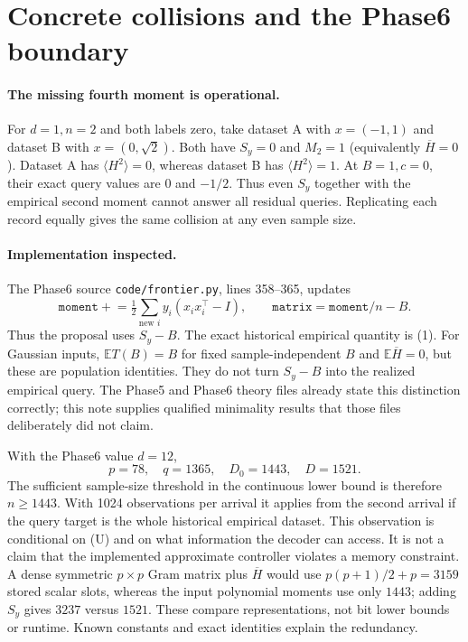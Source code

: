\documentclass[11pt]{article}
\newcommand{\E}{\mathbb E}
\begin{document}
\section{Concrete collisions and the Phase6 boundary}

\paragraph{The missing fourth moment is operational.}
For $d=1,n=2$ and both labels zero, take dataset A with $x=(-1,1)$
and dataset B with $x=(0,\sqrt2)$. Both have $S_y=0$ and
$M_2=1$ (equivalently $\overline H=0$). Dataset A has
$\langle H^2\rangle=0$, whereas dataset B has
$\langle H^2\rangle=1$. At $B=1,c=0$, their exact query values
are $0$ and $-1/2$. Thus even $S_y$ together with the empirical
second moment cannot answer all residual queries. Replicating each
record equally gives the same collision at any even sample size.

\paragraph{Implementation inspected.}
The Phase6 source \texttt{code/frontier.py}, lines 358--365, updates
\[
 \texttt{moment}\mathrel{+}=
 \tfrac12\sum_{\text{new }i}y_i(x_ix_i^\top-I),\qquad
 \texttt{matrix}=\texttt{moment}/n-B.
\]
Thus the proposal uses $S_y-B$. The exact historical empirical
quantity is (1). For Gaussian inputs, $\E T(B)=B$ for fixed
sample-independent $B$ and $\E\overline H=0$, but these are
population identities. They do not turn $S_y-B$ into the realized
empirical query. The Phase5 and Phase6 theory files already state
this distinction correctly; this note supplies qualified minimality
results that those files deliberately did not claim.

With the Phase6 value $d=12$,
\[
 p=78,\quad q=1365,\quad D_0=1443,\quad D=1521.
\]
The sufficient sample-size threshold in the continuous lower bound
is therefore $n\ge1443$. With 1024 observations per arrival it
applies from the second arrival if the query target is the whole
historical empirical dataset. This observation is conditional on
(U) and on what information the decoder can access. It is not a
claim that the implemented approximate controller violates a memory
constraint. A dense symmetric $p\times p$ Gram matrix plus
$\overline H$ would use $p(p+1)/2+p=3159$ stored scalar slots,
whereas the input polynomial moments use only $1443$; adding $S_y$
gives $3237$ versus $1521$. These compare representations, not bit
lower bounds or runtime. Known constants and exact identities explain
the redundancy.
\end{document}
